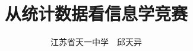 \documentclass{noithesis}
\title{从统计数据看信息学竞赛}
\author{江苏省天一中学~~邱天异}
\begin{document}
\begin{NoHyper}

\theoremstyle{plain}
\newtheorem{theorem}{\hspace{2em}定理}[section]
\newtheorem{corollary}{\hspace{2em}推论}[theorem]
\newtheorem{lemma}[theorem]{\hspace{2em}引理}
\newtheorem{proposition}[theorem]{\hspace{2em}命题}
\theoremstyle{definition}
\newtheorem{definition}[theorem]{\hspace{2em}定义}
\newtheorem{assumption}[theorem]{\hspace{2em}假设}

\maketitle



\end{NoHyper}
\end{document}
